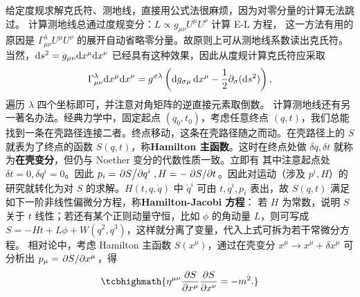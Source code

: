 给定度规求解克氏符、测地线，直接用公式法很麻烦，因为对零分量的计算无法跳过。
计算测地线总通过度规变分：$L\propto g_{\mu\nu} U^\mu U^\nu$ 计算 E-L 方程，
这一方法有用的原因是 $\Gamma^\lambda_{\mu\nu}U^\mu U^\nu$ 的展开自动省略零分量。故原则上可从测地线系数读出克氏符。
当然，$\dd s^2=g_{\mu\nu}\dd x^\mu\dd x^\nu$ 已经具有这种效果，因此从度规计算克氏符应采取
\[\Gamma^\lambda_{\mu\nu}\dd x^\mu\dd x^\nu=g^{\sigma\lambda}\left(\dd g_{\sigma\mu}\,\dd x^\mu- \frac{1}{2} \partial_\sigma(\dd s^2)\right),\]
遍历 $\lambda$ 四个坐标即可，并注意对角矩阵的逆直接元素取倒数。
计算测地线还有另一著名办法。经典力学中，固定起点 $(q_0,t_0)$，考虑任意终点 $(q,t)$，我们总能找到一条在壳路径连接二者。终点移动，这条在壳路径随之而动。在壳路径上的 $S$ 就表为了终点的函数 $S(q,t)$，称\textbf{Hamilton 主函数}。这时在终点处做 $\delta q,\delta t$ 就称为\textbf{在壳变分}，但仍与 Noether 变分的代数性质一致。立即有
其中注意起点处 $\delta t=0,\delta q^i=0$。因此 $p_i=\pdv*{S}{q^i},H=-\pdv*{S}{t}$。因此对运动（涉及 $p^i,H$）的研究就转化为对 $S$ 的求解。$H(t,q,\dot q)$ 中 $\dot q^i$ 可由 $t,q^i,p_i$ 表出，故 $S(q,t)$ 满足如下一阶非线性偏微分方程，称\textbf{Hamilton-Jacobi 方程}：
若 $H$ 为常数，说明 $S$ 关于 $t$ 线性；若还有某个正则动量守恒，比如 $\phi$ 的角动量 $L$，则可写成 $S=-Ht + L\phi + W(q^2,q^3)$，这样就分离了变量，代入上式可拆为若干常微分方程。
相对论中，考虑 Hamilton 主函数 $S(x^\mu)$，通过在壳变分 $x^\mu\to x^\mu+\delta x^\mu$ 可分析出 $p_\mu=\pdv*{S}{x^\mu}$，得
\[
\tcbhighmath{\eta^{\mu\nu}\pdv{S}{x^\mu}\pdv{S}{x^\nu}=-m^2.}
\]

